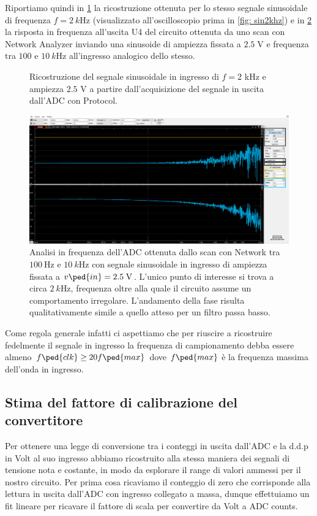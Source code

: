 \documentclass[10pt, a4paper, italian]{article}
\begin{document}
Riportiamo quindi in \cref{fig: sin2khzpy} la ricostruzione ottenuta per lo
stesso segnale sinusoidale di frequenza $f = \SI{2}{k\Hz}$ (visualizzato
all'oscilloscopio prima in \cref{fig: sin2khz}) e in \cref{fig: net}
la risposta in frequenza all'uscita U4 del circuito ottenuta da uno scan con
Network Analyzer inviando una sinusoide di ampiezza fissata a $2.5 \; \si{\V}$
e frequenza tra $100$ e $\SI{10}{k\Hz}$ all'ingresso analogico dello stesso.
\begin{figure}[htbp]
    \centering
    \caption{Ricostruzione del segnale sinusoidale in ingresso di $f = 2$
    kHz e ampiezza $2.5$ V a partire dall'acquisizione del segnale in uscita
    dall'ADC con Protocol.
    \label{fig: sin2khzpy}}
\end{figure}
\begin{figure}[htbp]
	\centering
	\includegraphics[scale=0.335]{Net100-10k}
	\caption{Analisi in frequenza dell'ADC ottenuta dallo scan con Network
	tra $\SI{100}{\Hz}$ e $\SI{10}{k\Hz}$ con segnale sinusoidale in ingresso
	di ampiezza fissata a $v\ped{in} = 2.5 \; \si{\V}$. L'unico punto di
	interesse si trova a circa $\SI{2}{k\Hz}$, frequenza oltre alla quale il
	circuito assume un comportamento irregolare. L'andamento della fase risulta
	qualitativamente simile a quello atteso per un filtro passa basso.
	\label{fig: net}}
\end{figure}

Come regola generale infatti ci aspettiamo che per riuscire a ricostruire
fedelmente il segnale in ingresso la frequenza di campionamento debba essere
almeno $f\ped{clk} \geq 20 f\ped{max}$ dove $f\ped{max}$ è la frequenza
massima dell'onda in ingresso.

\subsection{Stima del fattore di calibrazione del convertitore}
Per ottenere una legge di conversione tra i conteggi in uscita dall'ADC e
la d.d.p in Volt al suo ingresso abbiamo ricostruito alla stessa maniera dei
segnali di tensione nota e costante, in modo da esplorare il range di valori
ammessi per il nostro circuito. Per prima cosa ricaviamo il conteggio di zero
che corrisponde alla lettura in uscita dall'ADC con ingresso collegato a massa,
dunque effettuiamo un fit lineare per ricavare il fattore di scala per
convertire da Volt a ADC counts.
\end{document}
